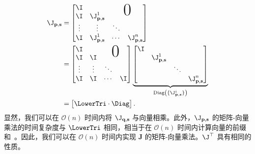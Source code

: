 \begin{equation}
  \begin{aligned}
    \J_{\mathbf{p, s}} & =
    \begin{bmatrix}
      \I     &                        &                                                 &                        \\
      \I     & \J^{1}_{\mathbf{p, s}} & \multicolumn{2}{c}{\raisebox{1ex}[0pt]{\Huge0}}                          \\
      \vdots & \vdots                 & \ddots                                          &                        \\
      \I     & \J^{1}_{\mathbf{p, s}} & \cdots                                          & \J^{n}_{\mathbf{p, s}} \\
    \end{bmatrix} \\
                       & =
    \begin{bmatrix}
      \I     &        &                                                      \\
      \I     & \I     & \multicolumn{2}{c}{\raisebox{1ex}[0pt]{\Huge0}}      \\
      \vdots & \vdots & \ddots                                          &    \\
      \I     & \I     & \cdots                                          & \I \\
    \end{bmatrix}
    \underbrace{
    \begin{bmatrix}
        \I &                        &        &                        \\
           & \J^{1}_{\mathbf{p, s}} &        &                        \\
           &                        & \ddots &                        \\
           &                        &        & \J^{n}_{\mathbf{p, s}}
      \end{bmatrix}}_{\mathrm{Diag}\left(\{\J^{i}_{\mathbf{p, s}}\}\right)}                                      \\&=
    \begin{bmatrix}
      \LowerTri \cdot \Diag
    \end{bmatrix}.
  \end{aligned}
\end{equation}
显然，我们可以在 $\mathcal{O}(n)$ 时间内将 $\J_{\mathbf{q, s}}$ 与向量相乘。此外，$\J_{\mathbf{p, s}}$ 的矩阵-向量乘法的时间复杂度与 $\LowerTri$ 相同，相当于在 $\mathcal{O}(n)$ 时间内计算向量的前缀和~\cite{harris2007parallel}。因此，我们可以在 $\mathcal{O}(n)$ 时间内实现 $\mathbf J$ 的矩阵-向量乘法。$\J^{\top}$ 具有相同的性质。

